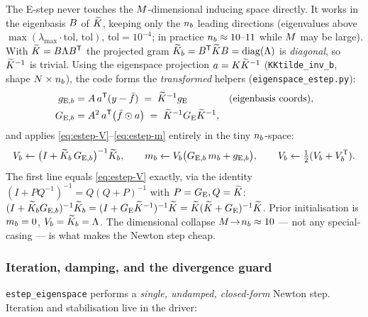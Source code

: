 The E-step never touches the $M$-dimensional inducing space directly. It works
in the eigenbasis $B$ of $\widetilde{K}$, keeping only the $n_{b}$ leading directions
(eigenvalues above $\max(\lambda_{\max}\!\cdot\!\mathrm{tol},\,\mathrm{tol})$,
$\mathrm{tol}=10^{-4}$; in practice $n_{b}\approx10\text{--}11$ while $M$ may be
large). With $\widetilde{K}=B\Lambda B^{\mathsf{T}}$ the projected gram
$\widetilde{K}_{b}=B^{\mathsf{T}}\widetilde{K}B=\operatorname{diag}(\Lambda)$ is \emph{diagonal}, so $\widetilde{K}^{-1}$
is trivial. Using the eigenspace projection $a=K\widetilde{K}^{-1}$
(\texttt{KKtilde\_inv\_b}, shape $N\times n_{b}$), the code forms the
\emph{transformed} helpers (\texttt{eigenspace\_estep.py}):
\begin{align}
g_{\mathrm E,b} &= A\,a^{\mathsf{T}}(y-\bar{f})\;=\;\widetilde{K}^{-1}g_{\mathrm{E}}
   &&(\text{eigenbasis coords}),\\
G_{\mathrm E,b} &= A^2\,a^{\mathsf{T}}\big(\bar{f}\odot a\big)\;=\;\widetilde{K}^{-1}G_{\mathrm{E}}\widetilde{K}^{-1},
\end{align}
and applies \eqref{eq:estep-V}--\eqref{eq:estep-m} entirely in the tiny
$n_{b}$-space:
\begin{equation}
V_{b} \leftarrow \big(I+\widetilde{K}_{b}\,G_{\mathrm E,b}\big)^{-1}\widetilde{K}_{b},\qquad
m_{b} \leftarrow V_{b}\big(G_{\mathrm E,b}\,m_{b}+g_{\mathrm E,b}\big),\qquad
V_{b} \leftarrow \tfrac12(V_{b}+V_{b}^{\mathsf{T}}).
\end{equation}
The first line equals \eqref{eq:estep-V} exactly, via the identity
$(I+PQ^{-1})^{-1}=Q(Q+P)^{-1}$ with $P=G_{\mathrm{E}},Q=\widetilde{K}$:
$(I+\widetilde{K}_{b} G_{\mathrm E,b})^{-1}\widetilde{K}_{b}=(I+G_{\mathrm{E}}\widetilde{K}^{-1})^{-1}\widetilde{K}
=\widetilde{K}(\widetilde{K}+G_{\mathrm{E}})^{-1}\widetilde{K}$. Prior initialisation is $m_{b}=0$,
$V_{b}=\widetilde{K}_{b}=\Lambda$. The dimensional collapse $M\!\to\!n_{b}\approx10$ ---
not any special-casing --- is what makes the Newton step cheap.

\subsubsection{Iteration, damping, and the divergence guard}

\texttt{estep\_eigenspace} performs a \emph{single, undamped, closed-form} Newton
step. Iteration and stabilisation live in the driver:

